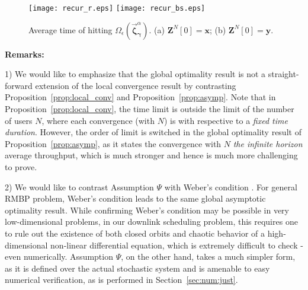 \documentclass[11pt,twocolumn]{IEEEtran}
\begin{document}
\begin{figure}
\centering
\texttt{[image: recur\_r.eps]}
\texttt{[image: recur\_bs.eps]}
\caption{Average time of hitting $\Omega_{\epsilon}(\vec{\bm \zeta}^{\alpha}_{\bm \gamma})$. (a) ${\bm Z}^N[0]=\bm x$; (b) $\bm Z^N[0]=\bm y$. }
\vspace{-8pt}
\label{fig:recur_time}
\end{figure}

\noindent \textbf{Remarks: }



1) We would like to emphasize that the global optimality result is
not a straight-forward extension of the local convergence result by
contrasting Proposition~\ref{prop:local_conv} and
Proposition~\ref{prop:asymp}. Note that in
Proposition~\ref{prop:local_conv}, the time limit is outside the
limit of the number of users $N$, where each convergence (with $N$)
is with respective to a \emph{fixed time duration}. However, the
order of limit is switched in the global optimality result of
Proposition~\ref{prop:asymp}, as it states the convergence with $N$
\emph{the infinite horizon} average throughput, which is much
stronger and hence is much more challenging to prove.

2) We would like to contrast Assumption $\Psi$ with Weber's
condition \cite{Weber}. For general RMBP problem, Weber's condition
leads to the same global asymptotic optimality result. While
confirming Weber's condition may be possible in very low-dimensional
problems, in our downlink scheduling problem, this requires one to
rule out the existence of both closed orbits and chaotic behavior of
a high-dimensional non-linear differential equation, which is
extremely difficult to check - even numerically. Assumption $\Psi$,
on the other hand, takes a much simpler form, as it is defined over
the actual stochastic system and is amenable to easy numerical
verification, as is performed in Section~\ref{sec:num:just}.
\end{document}
